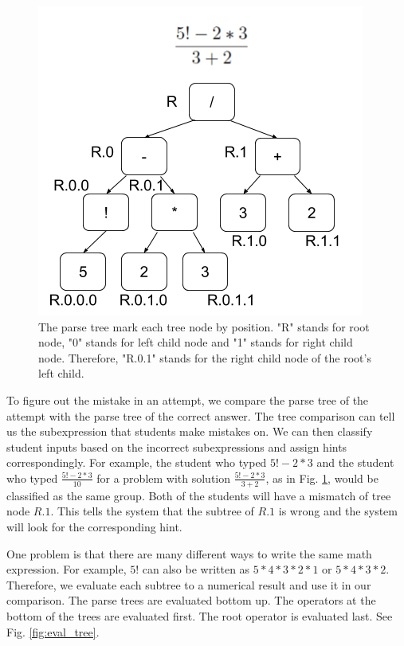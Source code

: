 \documentclass{llncs2e/llncs}
\begin{document}
\begin{figure}[ht]
   \centering
   \includegraphics[width=.5\textwidth]{image/Parse_Trees.png}
   \caption{The parse tree mark each tree node by position. "R" stands for root node, "0" stands for left child node and "1" stands for right child node. Therefore, "R.0.1" stands for the right child node of the root's left child.}
   \label{fig:parse_tree}
\end{figure}

To figure out the mistake in an attempt, we compare the parse tree of the attempt with the parse tree of the correct answer. The tree comparison can tell us the subexpression that students make mistakes on. We can then classify student inputs based on the incorrect subexpressions and assign hints correspondingly. For example, the student who typed $5!-2*3$ and the student who typed $\frac{5!-2*3}{10}$ for a problem with solution $\frac{5!-2*3}{3+2}$, as in Fig. \ref{fig:parse_tree}, would be classified as the same group. Both of the students will have a mismatch of tree node $R.1$. This tells the system that the subtree of $R.1$ is wrong and the system will look for the corresponding hint.

One problem is that there are many different ways to write the same math expression. For example, $5!$ can also be written as $5*4*3*2*1$ or $5*4*3*2$. Therefore, we evaluate each subtree to a numerical result and use it in our comparison. The parse trees are evaluated bottom up. The operators at the bottom of the trees are evaluated first. The root operator is evaluated last. See Fig. \ref{fig:eval_tree}. 
\end{document}
